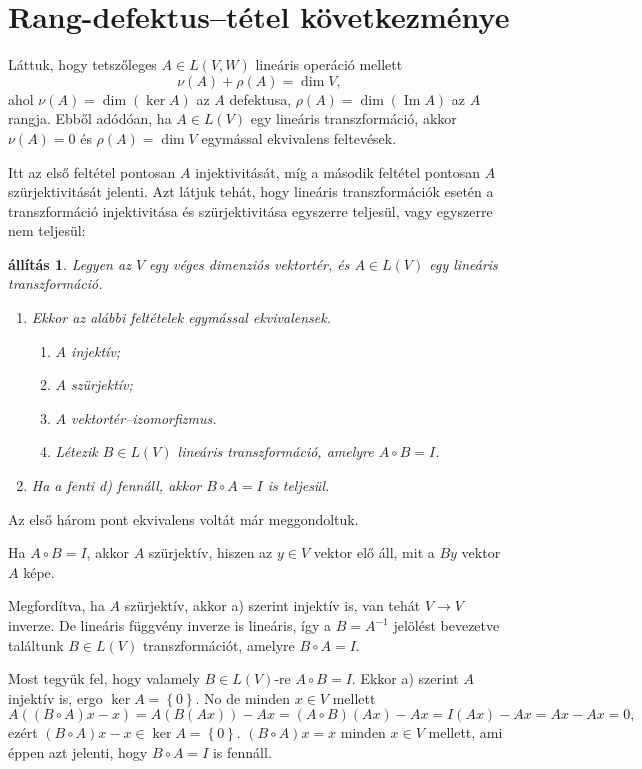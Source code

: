 \documentclass[9pt, showtrims]{memoir}
\makeatletter
\renewenvironment{proof}[1][\proofname]
    {\par\pushQED{\qed}%
    \normalfont \topsep6\p@\@plus6\p@\relax
    \trivlist
    \item[\hskip\labelsep
        \itshape
    #1\@addpunct{:}]\ignorespaces}
    {\popQED\endtrivlist\@endpefalse}
\theoremstyle{plain}
\newtheorem{proposition}{állítás}[section]
\theoremstyle{remark}
\theoremstyle{definition}
\DeclareMathOperator{\im}{Im}
\makeatother
\begin{document}
\section{Rang-defektus--tétel következménye}
Láttuk, hogy tetszőleges $A\in L\left( V,W \right)$ lineáris operáció mellett
\[
    \nu\left( A \right)+\rho\left( A \right)=\dim V,
\]
ahol $\nu\left( A \right)=\dim\left( \ker A \right)$ az $A$ defektusa,
$\rho\left( A \right)=\dim\left(\im A \right)$ az $A$ rangja.
Ebből adódóan, ha $A\in L\left( V \right)$ egy lineáris transzformáció,
akkor $\nu\left( A \right)=0$ és $\rho\left( A \right)=\dim V$ egymással ekvivalens feltevések.

Itt az első feltétel pontosan $A$ injektivitását, 
míg a második feltétel pontosan $A$ szürjektivitását jelenti.
Azt látjuk tehát, 
hogy lineáris transzformációk esetén a transzformáció injektivitása és szürjektivitása egyszerre teljesül, 
vagy egyszerre nem teljesül:
\begin{proposition}
    Legyen az $V$ egy véges dimenziós vektortér, és $A\in L\left( V \right)$ egy lineáris transzformáció.
    \begin{enumerate}
        \item 
            Ekkor az alábbi feltételek egymással ekvivalensek.
        \begin{enumerate}
            \item $A$ injektív;
            \item $A$ szürjektív;
            \item $A$ vektortér--izomorfizmus.
            \item Létezik $B\in L\left( V \right)$ lineáris transzformáció, amelyre $A\circ B=I$.
        \end{enumerate}
        \item
            Ha a fenti d) fennáll, akkor $B\circ A=I$ is teljesül.\qedhere
    \end{enumerate}
\end{proposition}
\begin{proof}
    Az első három pont ekvivalens voltát már meggondoltuk.

    Ha $A\circ B=I$, akkor $A$ szürjektív, hiszen az $y\in V$ vektor elő áll,
    mit a $By$ vektor $A$ képe.
    
    Megfordítva, ha $A$ szürjektív, akkor a) szerint injektív is, van tehát $V\to V$ inverze.
    De lineáris függvény inverze is lineáris, 
    így a $B=A^{-1}$ jelölést bevezetve találtunk $B\in L\left( V \right)$
    transzformációt, amelyre $B\circ A=I$.

    Most tegyük fel, hogy valamely $B\in L\left( V \right)$-re $A\circ B=I$.
    Ekkor a) szerint $A$ injektív is, ergo $\ker A=\left\{ 0 \right\}$.
    No de minden $x\in V$ mellett
    \[
        A\left( (B\circ A)x-x \right)
        =
        A\left( B\left( Ax \right) \right)-Ax
        =
        \left( A\circ B \right)\left( Ax \right)-Ax
        =
        I\left( Ax \right)-Ax
        =
        Ax-Ax=0,
    \]
    ezért $(B\circ A)x-x\in\ker A=\left\{ 0 \right\}$. 
    $(B\circ A)x=x$ minden $x\in V$ mellett, ami éppen azt jelenti, hogy $B\circ A=I$ is fennáll.
\end{proof}
\end{document}
